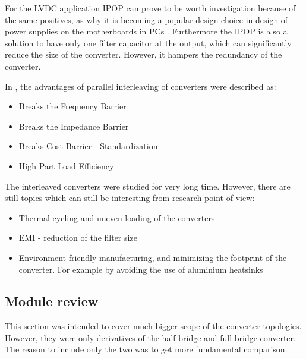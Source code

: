 \documentclass[]{scrartcl}
\newenvironment{remark}[1][Remark]{\begin{trivlist}
		\item[\hskip \labelsep {\bfseries #1}]}{\end{trivlist}}
\begin{document}

For the LVDC application IPOP can prove to be worth investigation because of the same positives, as why it is becoming a popular design choice in design of power supplies on the motherboards in PCs \cite{VanWyk2014}. Furthermore the IPOP is also a solution to have only one filter capacitor at the output, which can significantly reduce the size of the converter. However, it hampers the redundancy of the converter.


In \cite{Kolar2014a}, the advantages of parallel interleaving of converters were described as:

\begin{itemize}
	\item Breaks the Frequency Barrier
	\item Breaks the Impedance Barrier
	\item Breaks Cost Barrier - Standardization
	\item High Part Load Efficiency
\end{itemize}

The interleaved converters were studied for very long time. However, there are still topics which can still be interesting from research point of view:

\begin{itemize}
	\item Thermal cycling and uneven loading of the converters
	\item EMI - reduction of the filter size
	\item Environment friendly manufacturing, and minimizing the footprint of the converter. For example by avoiding the use of aluminium heatsinks \cite{Popovic-Gerber2011} 
\end{itemize}



\subsection{Module  review}
\begin{remark}
	This section was intended to cover much bigger scope of the converter topologies. However, they were only derivatives of the half-bridge and full-bridge converter. The reason to include only the two was to get more fundamental comparison. 
\end{remark}
\end{document}
